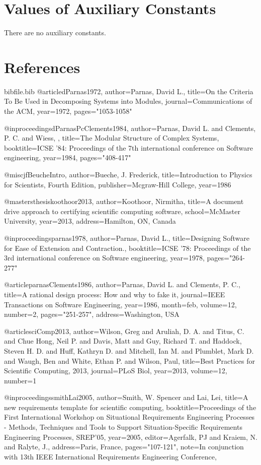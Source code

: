 \documentclass[12pt]{article}
\begin{document}
\section{Values of Auxiliary Constants}
\label{Sec:AuxConstants}
There are no auxiliary constants.
\section{References}
\label{Sec:References}
\begin{filecontents*}{bibfile.bib}
@article{dParnas1972,
author={Parnas, David L.},
title={On the Criteria To Be Used in Decomposing Systems into Modules},
journal={Communications of the ACM},
year={1972},
pages={"1053-1058"}}

@inproceedings{dParnasPcClements1984,
author={Parnas, David L. and Clements, P. C. and Wiess, },
title={The Modular Structure of Complex Systems},
booktitle={ICSE '84: Proceedings of the 7th international conference on Software engineering},
year={1984},
pages={"408-417"}}

@misc{jfBeucheIntro,
author={Bueche, J. Frederick},
title={Introduction to Physics for Scientists, Fourth Edition},
publisher={Mcgraw-Hill College},
year={1986}}

@mastersthesis{koothoor2013,
author={Koothoor, Nirmitha},
title={A document drive approach to certifying scientific computing software},
school={McMaster University},
year={2013},
address={Hamilton, ON, Canada}}

@inproceedings{parnas1978,
author={Parnas, David L.},
title={Designing Software for Ease of Extension and Contraction.},
booktitle={ICSE '78: Proceedings of the 3rd international conference on Software engineering},
year={1978},
pages={"264-277"}}

@article{parnasClements1986,
author={Parnas, David L. and Clements, P. C.},
title={A rational design process: How and why to fake it},
journal={IEEE Transactions on Software Engineering},
year={1986},
month={feb},
volume={12},
number={2},
pages={"251-257"},
address={Washington, USA}}

@article{sciComp2013,
author={Wilson, Greg and Aruliah, D. A. and Titus, C. and Chue Hong, Neil P. and Davis, Matt and Guy, Richard T. and Haddock, Steven H. D. and Huff, Kathryn D. and Mitchell, Ian M. and Plumblet, Mark D. and Waugh, Ben and White, Ethan P. and Wilson, Paul},
title={Best Practices for Scientific Computing, 2013},
journal={PLoS Biol},
year={2013},
volume={12},
number={1}}

@inproceedings{smithLai2005,
author={Smith, W. Spencer and Lai, Lei},
title={A new requirements template for scientific computing},
booktitle={Proceedings of the First International Workshop on Situational Requirements Engineering Processes - Methods, Techniques and Tools to Support Situation-Specific Requirements Engineering Processes, SREP'05},
year={2005},
editor={Agerfalk, PJ and Kraiem, N. and Ralyte, J.},
address={Paris, France},
pages={"107-121"},
note={In conjunction with 13th IEEE International Requirements Engineering Conference,}}
\end{filecontents*}
\nocite{*}
\printbibliography[heading=none]
\end{document}
